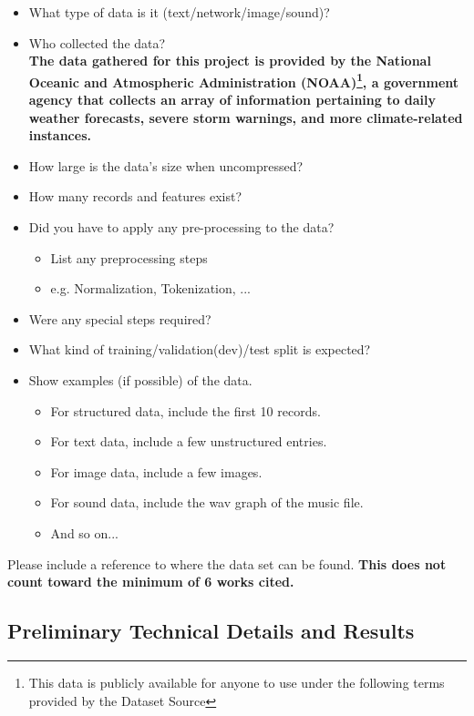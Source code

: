 \documentclass[conference]{IEEEtran}
\begin{document}
\begin{itemize}
  \item What type of data is it (text/network/image/sound)?
  \item Who collected the data? \\

  \textbf{The data gathered for this project is provided by the National Oceanic and Atmospheric Administration (NOAA)\footnote{This data is publicly available for anyone to use under the following terms provided by the Dataset Source}, a government agency that collects an array of information pertaining to daily weather forecasts, severe storm warnings, and more climate-related instances.} \\

  \item How large is the data's size when uncompressed?
  \item How many records and features exist?
  \item Did you have to apply any pre-processing to the data?
  \begin{itemize}
    \item List any preprocessing steps
    \item e.g. Normalization, Tokenization, ...
  \end{itemize}
  \item Were any special steps required?
  \item What kind of training/validation(dev)/test split is expected?
  \item Show examples (if possible) of the data.
  \begin{itemize}
    \item For structured data, include the first 10 records.
    \item For text data, include a few unstructured entries.
    \item For image data, include a few images.
    \item For sound data, include the wav graph of the music file.
    \item And so on...
  \end{itemize}
\end{itemize}

Please include a reference to where the data set can be found. \textbf{This does not count toward the minimum of 6 works cited.}

\subsection{Preliminary Technical Details and Results}
\end{document}
